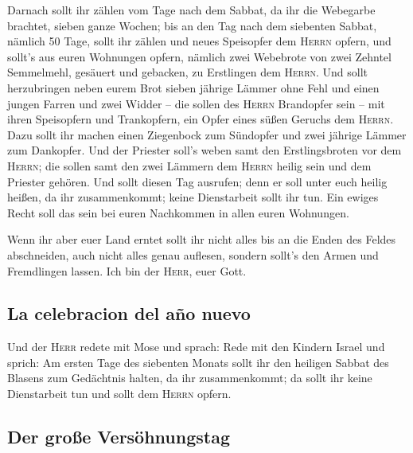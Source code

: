  Darnach sollt ihr zählen vom Tage nach dem Sabbat, da
ihr die Webegarbe brachtet, sieben ganze Wochen;  bis an
den Tag nach dem siebenten Sabbat, nämlich 50 Tage, sollt ihr zählen und
neues Speisopfer dem \textsc{Herrn} opfern,  und sollt's
aus euren Wohnungen opfern, nämlich zwei Webebrote von zwei Zehntel
Semmelmehl, gesäuert und gebacken, zu Erstlingen dem \textsc{Herrn}.
 Und sollt herzubringen neben eurem Brot sieben jährige
Lämmer ohne Fehl und einen jungen Farren und zwei Widder -- die sollen
des \textsc{Herrn} Brandopfer sein -- mit ihren Speisopfern und
Trankopfern, ein Opfer eines süßen Geruchs dem \textsc{Herrn}.
 Dazu sollt ihr machen einen Ziegenbock zum Sündopfer und
zwei jährige Lämmer zum Dankopfer.  Und der Priester
soll's weben samt den Erstlingsbroten vor dem \textsc{Herrn}; die sollen
samt den zwei Lämmern dem \textsc{Herrn} heilig sein und dem Priester
gehören.  Und sollt diesen Tag ausrufen; denn er soll
unter euch heilig heißen, da ihr zusammenkommt; keine Dienstarbeit sollt
ihr tun. Ein ewiges Recht soll das sein bei euren Nachkommen in allen
euren Wohnungen.

 Wenn ihr aber euer Land erntet sollt ihr nicht alles bis
an die Enden des Feldes abschneiden, auch nicht alles genau auflesen,
sondern sollt's den Armen und Fremdlingen lassen. Ich bin der
\textsc{Herr}, euer Gott.

\hypertarget{la-celebracion-del-auxf1o-nuevo}{%
\subsection{La celebracion del año
nuevo}\label{la-celebracion-del-auxf1o-nuevo}}

 Und der \textsc{Herr} redete mit Mose und sprach:
 Rede mit den Kindern Israel und sprich: Am ersten Tage
des siebenten Monats sollt ihr den heiligen Sabbat des Blasens zum
Gedächtnis halten, da ihr zusammenkommt;  da sollt ihr
keine Dienstarbeit tun und sollt dem \textsc{Herrn} opfern.

\hypertarget{der-grouxdfe-versuxf6hnungstag}{%
\subsection{Der große
Versöhnungstag}\label{der-grouxdfe-versuxf6hnungstag}}


